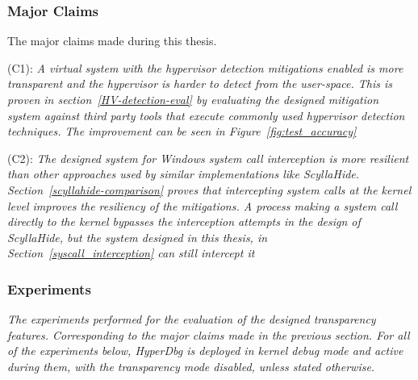 \subsubsection{Major Claims}
The major claims made during this thesis.\\

\begin{compactdesc}

    \item[(C1):] \textit{A virtual system with the hypervisor detection mitigations enabled is more transparent and the hypervisor is harder to detect from the user-space. 
    This is proven in section~\ref{HV-detection-eval} by evaluating the designed mitigation system against third party tools that execute commonly used hypervisor detection techniques. 
    The improvement can be seen in Figure~\ref{fig:test_accuracy}}

    \item[(C2):] \textit{The designed system for Windows system call interception is more resilient than other approaches used by similar implementations like ScyllaHide. Section~\ref{scyllahide-comparison}
    proves that intercepting system calls at the kernel level improves the resiliency of the mitigations. 
    A process making a system call directly to the kernel bypasses the interception attempts in the design of ScyllaHide, but the system designed in this thesis, in Section~\ref{syscall_interception} can still intercept it}

\end{compactdesc}

\subsubsection{Experiments}
\textit{The experiments performed for the evaluation of the designed transparency features. Corresponding to the major claims made in the previous section.
For all of the experiments below, HyperDbg is deployed in kernel debug mode and active during them, with the transparency mode disabled, unless stated otherwise.}


